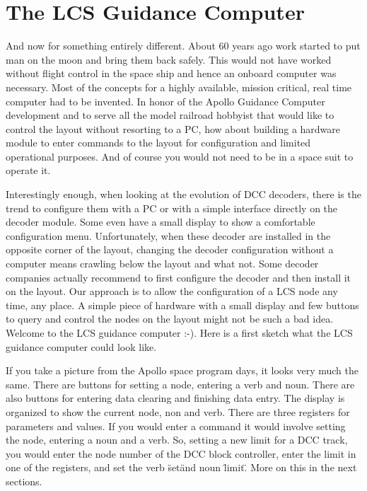 \chapter{The LCS Guidance Computer}

And now for something entirely different. About 60 years ago work started to put man on the moon and bring them back safely. This would not have worked without flight control in the space ship and hence an onboard computer was necessary. Most of the concepts for a highly available, mission critical, real time computer had to be invented. In honor of the Apollo Guidance Computer development and to serve all the model railroad hobbyist that would like to control the layout without resorting to a PC, how about building a hardware module to enter commands to the layout for configuration and limited operational purposes. And of course you would not need to be in a space suit to operate it.

Interestingly enough, when looking at the evolution of DCC decoders, there is the trend to configure them with a PC or with a simple interface directly on the decoder module. Some even have a small display to show a comfortable configuration menu. Unfortunately, when these decoder are installed in the opposite corner of the layout, changing the decoder configuration without a computer means crawling below the layout and what not. Some decoder companies actually recommend to first configure the decoder and then install it on the layout. Our approach is to allow the configuration of a LCS node any time, any place. A simple piece of hardware with a small display and few buttons to query and control the nodes on the layout might not be such a bad idea. Welcome to the LCS guidance computer :-). Here is a first sketch what the LCS guidance computer could look like.


If you take a picture from the Apollo space program days, it looks very much the same. There are buttons for setting a node, entering a verb and noun. There are also buttons for entering data clearing and finishing data entry. The display is organized to show the current node, non and verb. There are three registers for parameters and values. If you would enter a command it would involve setting the node, entering a noun and a verb. So, setting a new limit for a DCC track, you would enter the node number of the DCC block controller, enter the limit in one of the registers, and set the verb \"set\" and noun \"limit\". More on this in the next sections.

